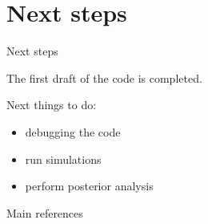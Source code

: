 \section{Next steps}

\begin{frame}{Next steps}

The first draft of the code is completed.

Next things to do:
    \begin{itemize}
        \item debugging the code
        \item run simulations
        \item perform posterior analysis
    \end{itemize}

\end{frame}

\begin{frame}{Main references}
    \nocite{colombiLearningBlockStructured2022a}
    \nocite{mohammadiBayesianStructureLearning2015a}
    \nocite{legramantiExtendedStochasticBlock2022}
    \nocite{bensonAdaptiveMCMCMultiple2018}
    \nocite{martinezNonparametricChangePoint2014}
    
    \printbibliography
    \renewcommand*{\bibfont}{\small}
\end{frame}

